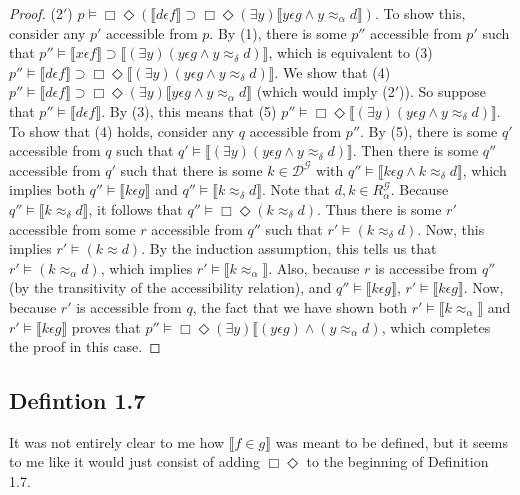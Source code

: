 \documentclass{article}
\newcommand{\lbc}{\llbracket}
\newcommand{\rbc}{\rrbracket}
\theoremstyle{definition}
\begin{document}
\begin{proof}
(2$'$) $p\vDash\Box\Diamond(\lbc d\epsilon f\rbc\supset\Box\Diamond(\exists y)\lbc y\epsilon g\wedge y\approx_\alpha d\rbc)$. To show this,
consider any $p'$ accessible from $p$. By (1), there is some $p''$ accessible from $p'$ such that 
$p''\vDash \lbc x\epsilon f\rbc\supset\lbc(\exists y)(y\epsilon g\wedge y\approx_\delta d)\rbc$, which is equivalent to
(3) $p''\vDash\lbc d\epsilon f\rbc\supset\Box\Diamond\lbc(\exists y)(y\epsilon g\wedge y\approx_\delta d)\rbc$. We show that
(4) $p''\vDash \lbc d\epsilon f\rbc\supset\Box\Diamond(\exists y)\lbc y\epsilon g\wedge y\approx_\alpha d\rbc$
(which would imply (2$'$)). So suppose that 
$p''\vDash\lbc d\epsilon f\rbc$. By (3), this means that 
(5) $p''\vDash\Box\Diamond\lbc(\exists y)(y\epsilon g\wedge y\approx_\delta d)\rbc$. To show that (4) holds, consider any 
$q$ accessible from $p''$. By (5), there is some $q'$ accessible from $q$ such that
$q'\vDash\lbc(\exists y)(y\epsilon g\wedge y\approx_\delta d)\rbc$. Then there is some $q''$ accessible from $q'$
such that there is some $k\in\mathcal{D}^\mathcal{G}$ with
$q''\vDash\lbc k\epsilon g\wedge k\approx_\delta d\rbc$, which implies both
$q''\vDash\lbc k\epsilon g\rbc$ and $q''\vDash\lbc k\approx_\delta d\rbc$. Note that $d,k\in R^\mathcal{G}_\alpha$. 
Because $q''\vDash\lbc k\approx_\delta d\rbc$, it follows that 
$q''\vDash\Box\Diamond (k\approx_\delta d)$. Thus there is some $r'$ accessible from some $r$ accessible from $q''$ such 
that $r'\vDash (k\approx_\delta d)$. Now, this implies $r'\vDash (k\approx d)$. By the induction assumption, this tells us 
that $r'\vDash (k\approx_\alpha d)$, which implies $r'\vDash\lbc k\approx_\alpha\rbc$. 
Also, because $r$ is accessibe from $q''$ (by the transitivity of the accessibility relation), and $q''\vDash\lbc k\epsilon g\rbc$, 
$r'\vDash\lbc k\epsilon g\rbc$. Now, because $r'$ is accessible from $q$, the fact that we have shown both 
$r'\vDash\lbc k\approx_\alpha\rbc$ and $r'\vDash\lbc k\epsilon g\rbc$ proves that 
$p''\vDash\Box\Diamond(\exists y)\lbc(y\epsilon g)\wedge (y\approx_\alpha d)$, which completes the proof in this case.
\end{proof}

\subsection*{Defintion 1.7}
It was not entirely clear to me how $\lbc f\in g\rbc$ was meant to be defined, 
but it seems to me like it would just consist of adding $\Box\Diamond$ to the beginning of Definition 1.7.
\end{document}
